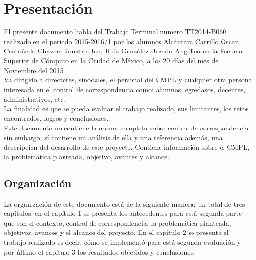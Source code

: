 \section{Presentación}

El presente documento habla del Trabajo Terminal numero TT2014-B060 realizado en el periodo 2015-2016/1 por los alumnos Alcántara Carrillo Oscar, Castañeda Chavero Jonatan Ian, Ruiz González Brenda Angélica en la Escuela Superior de Cómputo en la Ciudad de México, a los 20 días del mes de Noviembre del 2015.\\

Va dirigido a directores, sinodales, el personal del CMPL y cualquier otra persona interesada en el control de correspondencia como: alumnos, egredasos, docentes, administrativos, etc.\\
La finalidad es que se pueda evaluar el trabajo realizado, sus limitantes, los retos encontrados, logros y conclusiones.\\

Este documento no contiene la norma completa sobre control de correspondencia sin embargo, sí contiene un análisis de ella y una referencia además, una descripcion del desarrollo de este proyecto. Contiene información sobre el CMPL, la problemática planteada, objetivo, avances y alcance. \\

\subsection{Organización}

La organización de este documento está de la siguiente manera: un total de tres capítulos, en el capítulo 1 se presenta los antecedentes para está segunda parte que son el contexto, control de correspondencia, la problemática planteada, objetivos, avances y el alcance del proyecto. En el capítulo 2 se presenta el trabajo realizado es decir, cómo se implementó para está segunda evaluación y por último el capítulo 3 los resultados objetidos y conclusiones. \\
